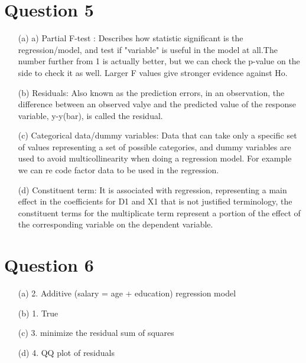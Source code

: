 \documentclass[12pt,letterpaper]{article}
\begin{document}
\section*{Question 5}
\vspace{.5cm}
\begin{enumerate}
	
	\item [(a)] a) Partial F-test : Describes how statistic significant is the regression/model, and test if "variable" is useful in the model at all.The number further from 1 is actually better, but we can check the p-value on the side to check it as well. Larger F values give stronger evidence against Ho. 
	
	
	\item [(b)] Residuals: Also known as the prediction errors, in an observation, the difference between an observed valye and the 
	predicted value of the response variable, y-y(bar), is called the residual. 
	
	
	
	\item [(c)] Categorical data/dummy variables: Data that can take only a specific set of values representing a set of possible categories, and dummy variables are used to avoid multicollinearity when doing a regression model. For example we can re code factor data to be used in the regression. 
		
	\item [(d)] Constituent term: It is associated with regression, representing a main effect in the coefficients for D1 and X1 that is not justified terminology, the constituent terms for the multiplicate term represent a portion of the effect of the corresponding variable on the dependent variable. 
	
\end{enumerate}

	\section*{Question 6}
	\vspace{.5cm}
	\begin{enumerate}
		
		\item [(a)] 2. Additive (salary = age + education) regression model
		
		\item [(b)] 1. True
		
		\item [(c)] 3. minimize the residual sum of squares
		
		\item [(d)] 4. QQ plot of residuals
		
	\end{enumerate}
	
\end{document}
